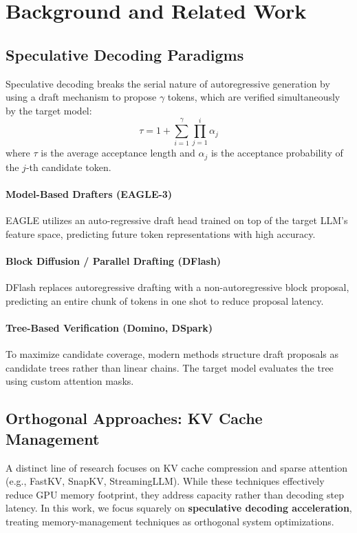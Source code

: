 \documentclass[11pt]{article}
\begin{document}
\section{Background and Related Work}

\subsection{Speculative Decoding Paradigms}
Speculative decoding breaks the serial nature of autoregressive generation by using a draft mechanism to propose $\gamma$ tokens, which are verified simultaneously by the target model:
\begin{equation}
    \tau = 1 + \sum_{i=1}^{\gamma} \prod_{j=1}^{i} \alpha_j
\end{equation}
where $\tau$ is the average acceptance length and $\alpha_j$ is the acceptance probability of the $j$-th candidate token.

\paragraph{Model-Based Drafters (EAGLE-3)}
EAGLE \citep{li2024eagle,li2024eagle2} utilizes an auto-regressive draft head trained on top of the target LLM's feature space, predicting future token representations with high accuracy.

\paragraph{Block Diffusion / Parallel Drafting (DFlash)}
DFlash \citep{zhang2024dflash} replaces autoregressive drafting with a non-autoregressive block proposal, predicting an entire chunk of tokens in one shot to reduce proposal latency.

\paragraph{Tree-Based Verification (Domino, DSpark)}
To maximize candidate coverage, modern methods structure draft proposals as candidate trees rather than linear chains. The target model evaluates the tree using custom attention masks.

\subsection{Orthogonal Approaches: KV Cache Management}
A distinct line of research focuses on KV cache compression and sparse attention (e.g., FastKV, SnapKV, StreamingLLM). While these techniques effectively reduce GPU memory footprint, they address capacity rather than decoding step latency. In this work, we focus squarely on \textbf{speculative decoding acceleration}, treating memory-management techniques as orthogonal system optimizations.
\end{document}

